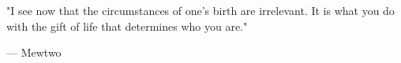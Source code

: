 \begin{dedica}  %

"I see now that the circumstances of one's birth are irrelevant. It is what you
do with the gift of life that determines who you are."
\begin{flushright}
--- Mewtwo
\end{flushright}

\end{dedica}

